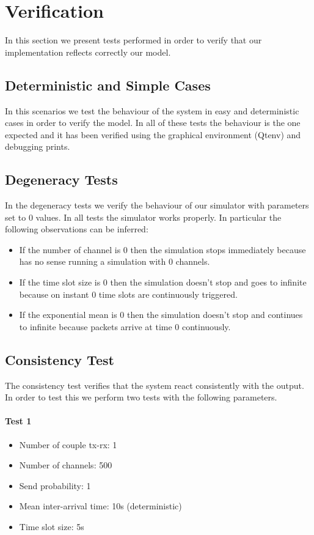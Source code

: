 \section{Verification}
In this section we present tests performed in order to verify that our implementation reflects correctly our model.

\subsection{Deterministic and Simple Cases}
In this scenarios we test the behaviour of the system in easy and deterministic cases in order to verify the model. In all of these tests the behaviour is the one expected and it has been verified using the graphical environment (Qtenv) and debugging prints.

\subsection{Degeneracy Tests}
In the degeneracy tests we verify the behaviour of our simulator with parameters set to 0 values. In all tests the simulator works properly. In particular the following observations can be inferred:
\begin{itemize}
	\item If the number of channel is 0 then the simulation stops immediately because has no sense running a simulation with 0 channels.
	\item If the time slot size is 0 then the simulation doesn't stop and goes to infinite because on instant 0  time slots are continuously triggered.
	\item If the exponential mean is 0 then the simulation doesn't stop and continues to infinite because packets arrive at time 0 continuously.
\end{itemize}

\subsection{Consistency Test}
The consistency test verifies that the system react consistently with the output. In order to test this we perform two tests with the following parameters.
\paragraph{Test 1}
\begin{itemize}
	\item Number of couple tx-rx: 1
	\item Number of channels: 500
	\item Send probability: 1
	\item Mean inter-arrival time: 10s (deterministic)
	\item Time slot size: 5s
\end{itemize}

